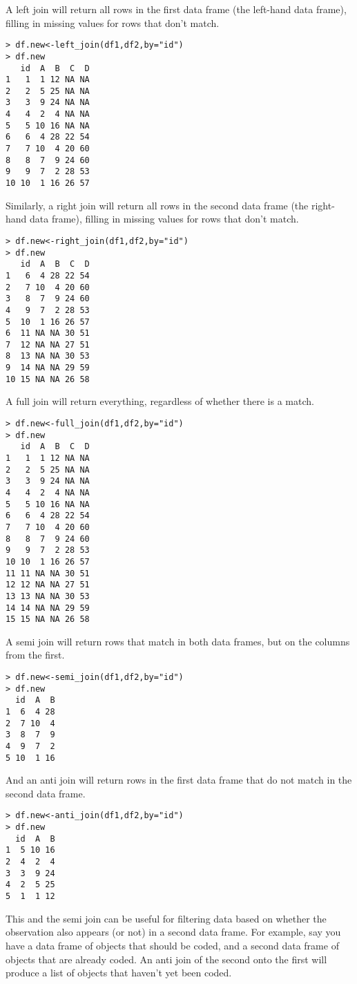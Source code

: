 \documentclass[12pt, oneside]{amsart}   	%
\begin{document}
A left join will return all rows in the first data frame (the left-hand data frame), filling in missing values for rows that don't match.

\begin{verbatim}
> df.new<-left_join(df1,df2,by="id")
> df.new
   id  A  B  C  D
1   1  1 12 NA NA
2   2  5 25 NA NA
3   3  9 24 NA NA
4   4  2  4 NA NA
5   5 10 16 NA NA
6   6  4 28 22 54
7   7 10  4 20 60
8   8  7  9 24 60
9   9  7  2 28 53
10 10  1 16 26 57
\end{verbatim}

Similarly, a right join will return all rows in the second data frame (the right-hand data frame), filling in missing values for rows that don't match.

\begin{verbatim}
> df.new<-right_join(df1,df2,by="id")
> df.new
   id  A  B  C  D
1   6  4 28 22 54
2   7 10  4 20 60
3   8  7  9 24 60
4   9  7  2 28 53
5  10  1 16 26 57
6  11 NA NA 30 51
7  12 NA NA 27 51
8  13 NA NA 30 53
9  14 NA NA 29 59
10 15 NA NA 26 58
\end{verbatim}

A full join will return everything, regardless of whether there is a match.

\begin{verbatim}
> df.new<-full_join(df1,df2,by="id")
> df.new
   id  A  B  C  D
1   1  1 12 NA NA
2   2  5 25 NA NA
3   3  9 24 NA NA
4   4  2  4 NA NA
5   5 10 16 NA NA
6   6  4 28 22 54
7   7 10  4 20 60
8   8  7  9 24 60
9   9  7  2 28 53
10 10  1 16 26 57
11 11 NA NA 30 51
12 12 NA NA 27 51
13 13 NA NA 30 53
14 14 NA NA 29 59
15 15 NA NA 26 58
\end{verbatim}

A semi join will return rows that match in both data frames, but on the columns from the first.

\begin{verbatim}
> df.new<-semi_join(df1,df2,by="id")
> df.new
  id  A  B
1  6  4 28
2  7 10  4
3  8  7  9
4  9  7  2
5 10  1 16
\end{verbatim}

And an anti join will return rows in the first data frame that do not match in the second data frame. 

\begin{verbatim}
> df.new<-anti_join(df1,df2,by="id")
> df.new
  id  A  B
1  5 10 16
2  4  2  4
3  3  9 24
4  2  5 25
5  1  1 12
\end{verbatim}

This and the semi join can be useful for filtering data based on whether the observation also appears (or not) in a second data frame. For example, say you have a data frame of objects that should be coded, and a second data frame of objects that are already coded. An anti join of the second onto the first will produce a list of objects that haven't yet been coded.
\end{document}
